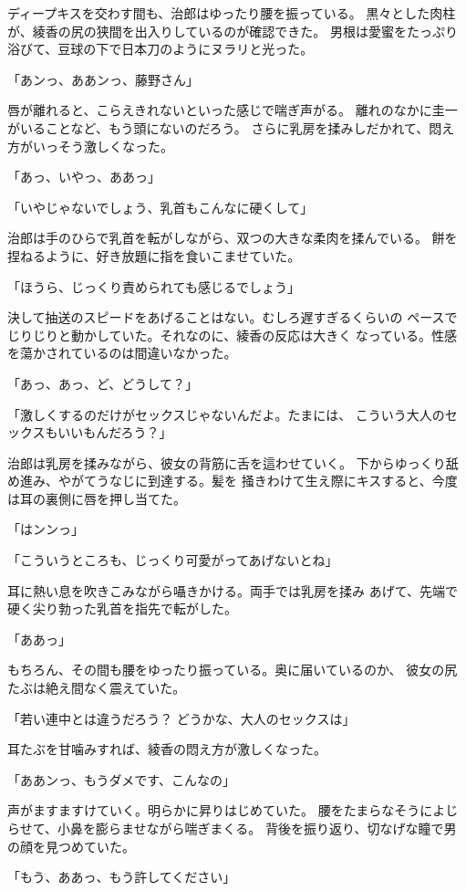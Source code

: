 ﻿\documentclass[
    book,tate,
    line_length=30zw,
    jafontsize=12pt,
    paper=b5j,
    landscape,
    ]{jlreq}
\begin{document}
ディープキスを交わす間も、治郎はゆったり腰を振っている。
黒々とした肉柱が、綾香の尻の狭間を出入りしているのが確認できた。
男根は愛蜜をたっぷり浴びて、豆球の下で日本刀のようにヌラリと光った。

「あンっ、ああンっ、藤野さん」

唇が離れると、こらえきれないといった感じで喘ぎ声がる。
離れのなかに圭一がいることなど、もう頭にないのだろう。
さらに乳房を揉みしだかれて、悶え方がいっそう激しくなった。

「あっ、いやっ、ああっ」

「いやじゃないでしょう、乳首もこんなに硬くして」

治郎は手のひらで乳首を転がしながら、双つの大きな柔肉を揉んでいる。
餅を捏ねるように、好き放題に指を食いこませていた。

「ほうら、じっくり責められても感じるでしょう」

決して抽送のスピードをあげることはない。むしろ遅すぎるくらいの
ペースでじりじりと動かしていた。それなのに、綾香の反応は大きく
なっている。性感を蕩かされているのは間違いなかった。

「あっ、あっ、ど、どうして？」

「激しくするのだけがセックスじゃないんだよ。たまには、
こういう大人のセックスもいいもんだろう？」

治郎は乳房を揉みながら、彼女の背筋に舌を這わせていく。
下からゆっくり舐め進み、やがてうなじに到達する。髪を
掻きわけて生え際にキスすると、今度は耳の裏側に唇を押し当てた。

「はンンっ」

「こういうところも、じっくり可愛がってあげないとね」

耳に熱い息を吹きこみながら囁きかける。両手では乳房を揉み
あげて、先端で硬く尖り勃った乳首を指先で転がした。

「ああっ」

もちろん、その間も腰をゆったり振っている。奥に届いているのか、
彼女の尻たぶは絶え間なく震えていた。

「若い連中とは違うだろう？ どうかな、大人のセックスは」

耳たぶを甘噛みすれば、綾香の悶え方が激しくなった。

「ああンっ、もうダメです、こんなの」

声がますますけていく。明らかに昇りはじめていた。
腰をたまらなそうによじらせて、小鼻を膨らませながら喘ぎまくる。
背後を振り返り、切なげな瞳で男の顔を見つめていた。

「もう、ああっ、もう許してください」
\end{document}
